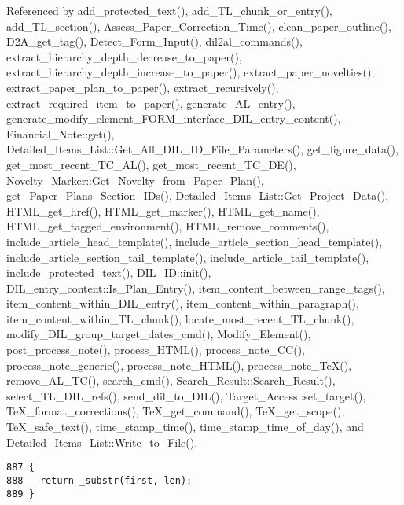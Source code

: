 Referenced by add\_\-protected\_\-text(), add\_\-TL\_\-chunk\_\-or\_\-entry(), add\_\-TL\_\-section(), Assess\_\-Paper\_\-Correction\_\-Time(), clean\_\-paper\_\-outline(), D2A\_\-get\_\-tag(), Detect\_\-Form\_\-Input(), dil2al\_\-commands(), extract\_\-hierarchy\_\-depth\_\-decrease\_\-to\_\-paper(), extract\_\-hierarchy\_\-depth\_\-increase\_\-to\_\-paper(), extract\_\-paper\_\-novelties(), extract\_\-paper\_\-plan\_\-to\_\-paper(), extract\_\-recursively(), extract\_\-required\_\-item\_\-to\_\-paper(), generate\_\-AL\_\-entry(), generate\_\-modify\_\-element\_\-FORM\_\-interface\_\-DIL\_\-entry\_\-content(), Financial\_\-Note::get(), Detailed\_\-Items\_\-List::Get\_\-All\_\-DIL\_\-ID\_\-File\_\-Parameters(), get\_\-figure\_\-data(), get\_\-most\_\-recent\_\-TC\_\-AL(), get\_\-most\_\-recent\_\-TC\_\-DE(), Novelty\_\-Marker::Get\_\-Novelty\_\-from\_\-Paper\_\-Plan(), get\_\-Paper\_\-Plans\_\-Section\_\-IDs(), Detailed\_\-Items\_\-List::Get\_\-Project\_\-Data(), HTML\_\-get\_\-href(), HTML\_\-get\_\-marker(), HTML\_\-get\_\-name(), HTML\_\-get\_\-tagged\_\-environment(), HTML\_\-remove\_\-comments(), include\_\-article\_\-head\_\-template(), include\_\-article\_\-section\_\-head\_\-template(), include\_\-article\_\-section\_\-tail\_\-template(), include\_\-article\_\-tail\_\-template(), include\_\-protected\_\-text(), DIL\_\-ID::init(), DIL\_\-entry\_\-content::Is\_\-Plan\_\-Entry(), item\_\-content\_\-between\_\-range\_\-tags(), item\_\-content\_\-within\_\-DIL\_\-entry(), item\_\-content\_\-within\_\-paragraph(), item\_\-content\_\-within\_\-TL\_\-chunk(), locate\_\-most\_\-recent\_\-TL\_\-chunk(), modify\_\-DIL\_\-group\_\-target\_\-dates\_\-cmd(), Modify\_\-Element(), post\_\-process\_\-note(), process\_\-HTML(), process\_\-note\_\-CC(), process\_\-note\_\-generic(), process\_\-note\_\-HTML(), process\_\-note\_\-Te\-X(), remove\_\-AL\_\-TC(), search\_\-cmd(), Search\_\-Result::Search\_\-Result(), select\_\-TL\_\-DIL\_\-refs(), send\_\-dil\_\-to\_\-DIL(), Target\_\-Access::set\_\-target(), Te\-X\_\-format\_\-corrections(), Te\-X\_\-get\_\-command(), Te\-X\_\-get\_\-scope(), Te\-X\_\-safe\_\-text(), time\_\-stamp\_\-time(), time\_\-stamp\_\-time\_\-of\_\-day(), and Detailed\_\-Items\_\-List::Write\_\-to\_\-File().



\footnotesize\begin{verbatim}887 {
888   return _substr(first, len);
889 }
\end{verbatim}\normalsize 
{}
